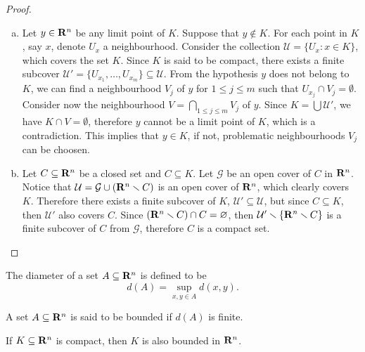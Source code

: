\begin{proof}
  \begin{enumerate}[(a)]
    \item Let \(y \in \mathbf{R}^n\) be any limit point of \(K\). Suppose that \(y
      \not\in K\). For each point in \(K\), say \(x\), denote \(U_x\) a
      neighbourhood. Consider the collection \(\mathcal U = \{U_x: x \in K\}\),
      which covers the set \(K\). Since \(K\) is said to be compact, there
      exists a finite subcover \(\mathcal U' = \{U_{x_1}, \dots, U_{x_m}\}
      \subseteq \mathcal U\). From the hypothesis \(y\) does not belong to
      \(K\), we can find a neighbourhood \(V_j\) of \(y\) for \(1 \leq j \leq
      m\) such that \(U_{x_j} \cap V_j = \emptyset\). Consider now the
      neighbourhood \(V = \bigcap_{1 \leq j \leq m} V_j\) of \(y\). Since \(K =
      \bigcup \mathcal U'\), we have \(K \cap V = \emptyset\), therefore \(y\)
      cannot be a limit point of \(K\), which is a contradiction. This implies
      that \(y \in K\), if not, problematic neighbourhoods \(V_j\) can be
      choosen.
    \item Let \(C \subseteq \mathbf{R}^n\) be a closed set and \(C \subseteq K\). Let
      \(\mathcal G\) be an open cover of \(C\) in \(\mathbf{R}^n\). Notice that
      \(\mathcal U = \mathcal G \cup (\mathbf{R}^n \smallsetminus C)\) is an open cover of
      \(\mathbf{R}^n\), which clearly covers \(K\). Therefore there exists a finite
      subcover of \(K\), \(\mathcal U' \subseteq \mathcal U\), but since \(C
      \subseteq K\), then \(\mathcal U'\) also covers \(C\). Since \((\mathbf{R}^n
      \smallsetminus C) \cap C = \varnothing\), then \(\mathcal U' \smallsetminus \{\mathbf{R}^n
      \smallsetminus C\}\) is a finite subcover of \(C\) from \(\mathcal G\),
      therefore \(C\) is a compact set.
  \end{enumerate}
\end{proof}

\begin{definition}
  The diameter of a set \(A \subseteq \mathbf{R}^n\) is defined to be
  \[
    d(A) = \sup_{x, y \in A} d(x, y).
  \]
\end{definition}

\begin{definition}\label{def: bounded}
  A set \(A \subseteq \mathbf{R}^n\) is said to be bounded if \(d(A)\) is finite.
\end{definition}

\begin{proposition}\label{prop: compact then bounded}
  If \(K \subseteq \mathbf{R}^n\) is compact, then \(K\) is also bounded in \(\mathbf{R}^n\).
\end{proposition}


